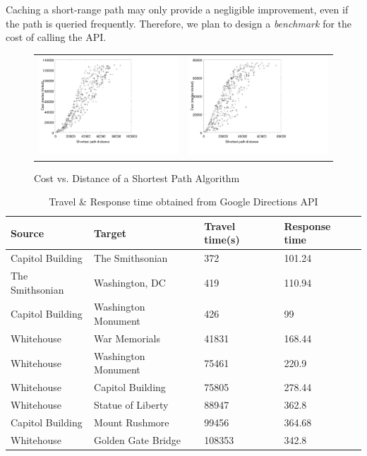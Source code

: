 \documentclass{sig-alternate}
\begin{document}
Caching a short-range path may only provide a negligible improvement, even if the path is queried frequently.
Therefore, we plan to design a {\em benchmark} for the cost of calling the API.


\begin{figure}[hbt]
  \center
  \begin{tabular}{@{}c@{ }c@{}}
        \includegraphics[width=0.5\columnwidth]{figures/AAL_dist}
        &
        \includegraphics[width=0.5\columnwidth]{figures/BJ_dist}
  \end{tabular}
  \caption{Cost vs. Distance of a Shortest Path Algorithm}
  \label{fig:spcost}
\end{figure}

\begin{table}[hbt]
\center
\color{red}
\begin{tabular}{|l|l|l|l|}\hline
   Source & Target & Travel time(s) & Response time \\\hline \hline
  Capitol Building & The Smithsonian & 372 & 101.24 \\\hline
  The Smithsonian & Washington, DC & 419 & 110.94 \\\hline
  Capitol Building & Washington Monument & 426 & 99 \\\hline
  Whitehouse & War Memorials & 41831 & 168.44 \\\hline
  Whitehouse & Washington Monument & 75461 & 220.9 \\\hline
  Whitehouse & Capitol Building & 75805 & 278.44 \\\hline
  Whitehouse & Statue of Liberty & 88947 & 362.8 \\\hline
  Capitol Building & Mount Rushmore & 99456 & 364.68 \\\hline
  Whitehouse & Golden Gate Bridge & 108353 & 342.8 \\\hline
\end{tabular}
\caption{Travel \& Response time obtained from Google Directions API}
\label{tbl:directiondata}
\end{table}
\end{document}
